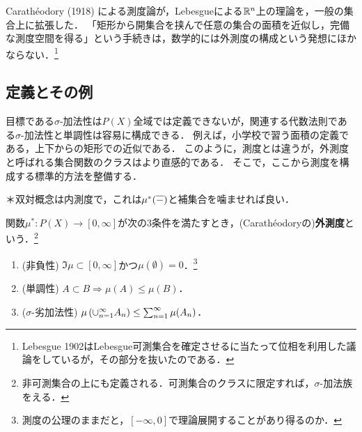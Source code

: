 \documentclass[uplatex, dvipdfmx]{jsreport}
\begin{document}
\begin{tcolorbox}[colframe=ForestGreen, colback=ForestGreen!10!white,breakable,colbacktitle=ForestGreen!40!white,coltitle=black,fonttitle=\bfseries\sffamily,
title=]
    Carathéodory (1918) \cite{Caratheodory}による測度論が，Lebesgueによる$\mathbb{R}^n$上の理論を，一般の集合上に拡張した．
    「矩形から開集合を挟んで任意の集合の面積を近似し，完備な測度空間を得る」という手続きは，数学的には外測度の構成という発想にほかならない．\footnote{Lebesgue 1902はLebesgue可測集合を確定させるに当たって位相を利用した議論をしているが，その部分を抜いたのである．}
\end{tcolorbox}

\subsection{定義とその例}

\begin{tcolorbox}[colframe=ForestGreen, colback=ForestGreen!10!white,breakable,colbacktitle=ForestGreen!40!white,coltitle=black,fonttitle=\bfseries\sffamily,
title=外測度：測度の面積への応用の王道＝被覆による面積近似]
    目標である$\sigma$-加法性は$P(X)$全域では定義できないが，関連する代数法則である$\sigma$-加法性と単調性は容易に構成できる．
    例えば，小学校で習う面積の定義である，上下からの矩形での近似である．
    このように，測度とは違うが，外測度と呼ばれる集合関数のクラスはより直感的である．
    そこで，ここから測度を構成する標準的方法を整備する．
    
    ＊双対概念は内測度で，これは$\mu^*(\overline{-})$と補集合を噛ませれば良い．
\end{tcolorbox}

\begin{definition}
    関数$\mu^*:P(X)\to[0,\infty]$が次の3条件を満たすとき，(Carathéodoryの)\textbf{外測度}という．\footnote{非可測集合の上にも定義される．可測集合のクラスに限定すれば，$\sigma$-加法族をえる．}
    \begin{enumerate}
        \item (非負性) $\Im\mu\subset[0,\infty]$かつ$\mu(\emptyset)=0$．\footnote{測度の公理のままだと，$[-\infty,0]$で理論展開することがあり得るのか．}
        \item (単調性) $A\subset B\Rightarrow \mu(A)\le\mu(B)$．
        \item ($\sigma$-劣加法性) $\mu\left(\cup_{n=1}^\infty A_n\right)\le\sum^\infty_{n=1}\mu(A_n)$．
    \end{enumerate}
\end{definition}
\end{document}
